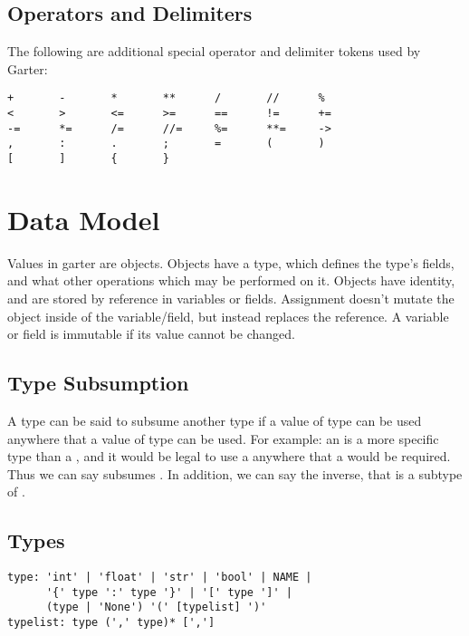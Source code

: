 \subsection{Operators and Delimiters}

The following are additional special operator and delimiter tokens used by Garter:

\begin{lstlisting}
+       -       *       **      /       //      %
<       >       <=      >=      ==      !=      +=
-=      *=      /=      //=     %=      **=     -> 
,       :       .       ;       =       (       )
[       ]       {       }
\end{lstlisting}

\section{Data Model}

Values in garter are objects. Objects have a type, which defines the type's
fields, and what other operations which may be performed on it. Objects have
identity, and are stored by reference in variables or fields. Assignment doesn't
mutate the object inside of the variable/field, but instead replaces the
reference. A variable or field is immutable if its value cannot be changed.


\subsection{Type Subsumption}
\label{subsumption}

A type  can be said to subsume another type  if a value of type
 can be used anywhere that a value of type  can be used. For
example: an  is a more specific type than a , and it would
be legal to use a  anywhere that a  would be required.
Thus we can say  subsumes . In addition, we can say the
inverse, that  is a subtype of .

\subsection{Types}

\begin{lstlisting}
type: 'int' | 'float' | 'str' | 'bool' | NAME |
      '{' type ':' type '}' | '[' type ']' |
      (type | 'None') '(' [typelist] ')'
typelist: type (',' type)* [',']
\end{lstlisting}

